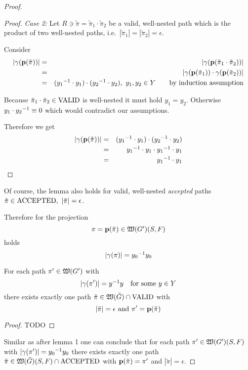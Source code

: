 \begin{proof}
\begin{proof}
\medskip
{\em Case 2:} Let $R \ni \tilde{\pi} = \tilde{\pi}_1 \cdot \tilde{\pi}_2$ be a
valid, well-nested path which is the product of two well-nested paths, i.e.\
$|\tilde{\pi}_1| = |\tilde{\pi}_2| = \epsilon$.

Consider 
\begin{eqnarray*}
|\gamma(\mathbf{p}({\tilde{\pi}}))| &=& |\gamma(\mathbf{p}({\tilde{\pi}_1 \cdot
\tilde{\pi}_2}))| \\
&=& |\gamma(\mathbf{p}({\tilde{\pi}_1})) \cdot \gamma(\mathbf{p}({\tilde{\pi}_2}))| \\
&=& (\mbox{${y_1}^{-1}$} \cdot y_1) \cdot (\mbox{${y_2}^{-1}$} \cdot y_2),\ y_1, y_2 \in
Y\qquad\text{by induction assumption}
\end{eqnarray*}

Because $\tilde{\pi}_1 \cdot \tilde{\pi}_2 \in \mathrm{VALID}$ is well-nested it 
must hold $y_1 = y_2$. Otherwise $y_1 \cdot \mbox{${y_2}^{-1}$} \equiv 0$ which would 
contradict our assumptions.

Therefore we get
\begin{eqnarray*}
|\gamma(\mathbf{p}({\tilde{\pi}}))| &=& (\mbox{${y_1}^{-1}$} \cdot y_1) \cdot (\mbox{${y_2}^{-1}$} \cdot
y_2)\\
&=& \mbox{${y_1}^{-1}$} \cdot y_1 \cdot \mbox{${y_1}^{-1}$} \cdot y_1 \\
&=& \mbox{${y_1}^{-1}$} \cdot y_1
\end{eqnarray*}
\end{proof}

Of course, the lemma also holds for valid, well-nested {\em accepted}
paths $\tilde{\pi} \in \mathrm{ACCEPTED},\ |\tilde{\pi}| = \epsilon$. 

Therefore for the projection
\[ \pi = \mathbf{p}({\tilde{\pi}}) \in \mbox{$\mathfrak{W}({G'})$}(S, F) \]
holds
\[ |\gamma(\pi)| = \mbox{${y_0}^{-1}$} y_0 \]

\bigskip
\begin{lemma}
For each path $\pi' \in \mbox{$\mathfrak{W}({G'})$}$ with
\[ |\gamma(\pi')| = \mbox{${y}^{-1}$} y \quad\text{for some }y \in Y \]
there exists exactly one path $\tilde{\pi} \in \mbox{$\mathfrak{W}({\tilde{G}})$} \cap \mathrm{VALID}$
with 
\[ |\tilde{\pi}| = \epsilon\text{ and }\pi' = \mathbf{p}({\tilde{\pi}}) \] 
\end{lemma}

\begin{proof}
TODO
\end{proof}

Similar as after lemma 1 one can conclude that for each path $\pi' \in
\mbox{$\mathfrak{W}({G'})$}(S, F)$ with $|\gamma(\pi')| = \mbox{${y_0}^{-1}$} y_0$ there exists exactly
one path $\tilde{\pi} \in \mbox{$\mathfrak{W}({\tilde{G}})$}(S, F) \cap \mathrm{ACCEPTED}$ with
$\mathbf{p}({\tilde{\pi}}) = \pi'$ and $|\tilde{\pi}| = \epsilon$.


\end{proof}
